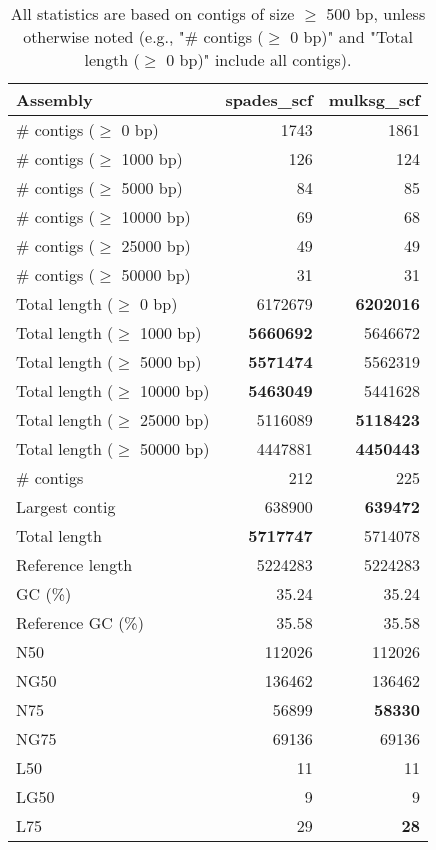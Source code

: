 \documentclass[12pt,a4paper]{article}
\begin{document}
\begin{table}[ht]
\begin{center}
\caption{All statistics are based on contigs of size $\geq$ 500 bp, unless otherwise noted (e.g., "\# contigs ($\geq$ 0 bp)" and "Total length ($\geq$ 0 bp)" include all contigs).}
\begin{tabular}{|l*{2}{|r}|}
\hline
Assembly & spades\_scf & mulksg\_scf \\ \hline
\# contigs ($\geq$ 0 bp) & 1743 & 1861 \\ \hline
\# contigs ($\geq$ 1000 bp) & 126 & 124 \\ \hline
\# contigs ($\geq$ 5000 bp) & 84 & 85 \\ \hline
\# contigs ($\geq$ 10000 bp) & 69 & 68 \\ \hline
\# contigs ($\geq$ 25000 bp) & 49 & 49 \\ \hline
\# contigs ($\geq$ 50000 bp) & 31 & 31 \\ \hline
Total length ($\geq$ 0 bp) & 6172679 & {\bf 6202016} \\ \hline
Total length ($\geq$ 1000 bp) & {\bf 5660692} & 5646672 \\ \hline
Total length ($\geq$ 5000 bp) & {\bf 5571474} & 5562319 \\ \hline
Total length ($\geq$ 10000 bp) & {\bf 5463049} & 5441628 \\ \hline
Total length ($\geq$ 25000 bp) & 5116089 & {\bf 5118423} \\ \hline
Total length ($\geq$ 50000 bp) & 4447881 & {\bf 4450443} \\ \hline
\# contigs & 212 & 225 \\ \hline
Largest contig & 638900 & {\bf 639472} \\ \hline
Total length & {\bf 5717747} & 5714078 \\ \hline
Reference length & 5224283 & 5224283 \\ \hline
GC (\%) & 35.24 & 35.24 \\ \hline
Reference GC (\%) & 35.58 & 35.58 \\ \hline
N50 & 112026 & 112026 \\ \hline
NG50 & 136462 & 136462 \\ \hline
N75 & 56899 & {\bf 58330} \\ \hline
NG75 & 69136 & 69136 \\ \hline
L50 & 11 & 11 \\ \hline
LG50 & 9 & 9 \\ \hline
L75 & 29 & {\bf 28} \\ \hline

\end{tabular}
\end{center}
\end{table}
\end{document}
